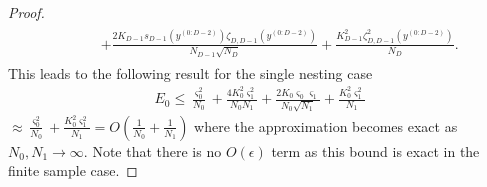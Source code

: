 \begin{proof}
\begin{align}
\begin{split}
\quad \quad &	+ \frac{2 K_{D-1}s_{D-1} \left(y^{(0:D-2)}\right)
		\zeta_{D,D-1}
		\left(y^{(0:D-2)}\right)}{N_{D-1} \sqrt{N_D}}
+\frac{K_{D-1}^2 \zeta^2_{D,D-1}\left(y^{(0:D-2)}\right)}{N_D}.
\end{split}
\end{align}
This leads to the following result for the single nesting case
\begin{align}
E_0 \le \frac{\varsigma^2_0}{N_0}+\frac{4 K_{0}^2 \varsigma_1^2}{N_0 N_{1}}
+\frac{2 K_{0}\varsigma_{0} \varsigma_1}{N_{0} \sqrt{N_1}}+\frac{K_0 ^2 \varsigma_1^2}{N_1}
\end{align}
$\approx \frac{\varsigma^2_0}{N_0}+\frac{K_0 ^2 \varsigma_1^2}{N_1} = O\left(\frac{1}{N_0}+\frac{1}{N_1}\right)$
where the approximation becomes exact as $N_0,N_1 \rightarrow \infty$.
Note that there is no $O\left(\epsilon\right)$ term as this bound is exact
in the finite sample case.


\end{proof}
